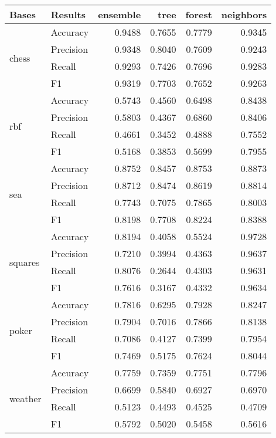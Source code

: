 \begin{tabular}{llrrrr}
\toprule
Bases & Results & ensemble & tree & forest & neighbors \\
\midrule
\multirow[c]{4}{*}{chess} & Accuracy & 0.9488 & 0.7655 & 0.7779 & 0.9345 \\
 & Precision & 0.9348 & 0.8040 & 0.7609 & 0.9243 \\
 & Recall & 0.9293 & 0.7426 & 0.7696 & 0.9283 \\
 & F1 & 0.9319 & 0.7703 & 0.7652 & 0.9263 \\
\cline{1-6}
\multirow[c]{4}{*}{rbf} & Accuracy & 0.5743 & 0.4560 & 0.6498 & 0.8438 \\
 & Precision & 0.5803 & 0.4367 & 0.6860 & 0.8406 \\
 & Recall & 0.4661 & 0.3452 & 0.4888 & 0.7552 \\
 & F1 & 0.5168 & 0.3853 & 0.5699 & 0.7955 \\
\cline{1-6}
\multirow[c]{4}{*}{sea} & Accuracy & 0.8752 & 0.8457 & 0.8753 & 0.8873 \\
 & Precision & 0.8712 & 0.8474 & 0.8619 & 0.8814 \\
 & Recall & 0.7743 & 0.7075 & 0.7865 & 0.8003 \\
 & F1 & 0.8198 & 0.7708 & 0.8224 & 0.8388 \\
\cline{1-6}
\multirow[c]{4}{*}{squares} & Accuracy & 0.8194 & 0.4058 & 0.5524 & 0.9728 \\
 & Precision & 0.7210 & 0.3994 & 0.4363 & 0.9637 \\
 & Recall & 0.8076 & 0.2644 & 0.4303 & 0.9631 \\
 & F1 & 0.7616 & 0.3167 & 0.4332 & 0.9634 \\
\cline{1-6}
\multirow[c]{4}{*}{poker} & Accuracy & 0.7816 & 0.6295 & 0.7928 & 0.8247 \\
 & Precision & 0.7904 & 0.7016 & 0.7866 & 0.8138 \\
 & Recall & 0.7086 & 0.4127 & 0.7399 & 0.7954 \\
 & F1 & 0.7469 & 0.5175 & 0.7624 & 0.8044 \\
\cline{1-6}
\multirow[c]{4}{*}{weather} & Accuracy & 0.7759 & 0.7359 & 0.7751 & 0.7796 \\
 & Precision & 0.6699 & 0.5840 & 0.6927 & 0.6970 \\
 & Recall & 0.5123 & 0.4493 & 0.4525 & 0.4709 \\
 & F1 & 0.5792 & 0.5020 & 0.5458 & 0.5616 \\
\cline{1-6}
\bottomrule
\end{tabular}

